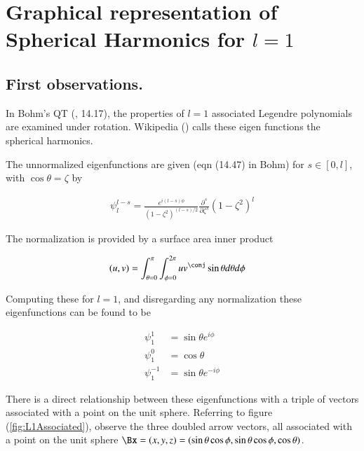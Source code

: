 %

\chapter{Graphical representation of Spherical Harmonics for $l=1$}
\label{chap:L1Associated}
{}
\date{Aug 16, 2009}

\beginArtNoToc

\section{First observations.}

In Bohm's QT (\cite{bohm1989qt}, 14.17), the properties of $l=1$ associated Legendre polynomials are examined under rotation.  Wikipedia (\cite{wiki:sphericalHarm}) calls these eigen functions the spherical harmonics.

The unnormalized eigenfunctions are given (eqn (14.47) in Bohm) for $s \in [0,l]$, with $\cos\theta = \zeta$ by

\begin{align}\label{eqn:L1Associated:foo0}
\psi_l^{l-s} = \frac{e^{i(l-s)\phi}}{(1-\zeta^2)^{(l-s)/2}} \frac{\partial^s}{\partial \zeta^s} (1-\zeta^2)^l
\end{align}

The normalization is provided by a surface area inner product

\begin{align}\label{eqn:L1Associated:foo2}
(u,v) &= \int_{\theta=0}^{\pi} \int_{\phi=0}^{2\pi} u v^\conj \sin\theta d\theta d\phi
\end{align}

Computing these for $l=1$, and disregarding any normalization these eigenfunctions can be found to be

\begin{align}\label{eqn:L1Associated:foo1}
\psi_1^1 &= \sin\theta e^{i\phi} \\
\psi_1^0 &= \cos\theta \\
\psi_1^{-1} &= \sin\theta e^{-i\phi}
\end{align}

There is a direct relationship between these eigenfunctions with a triple of vectors associated with a point on the unit sphere.  Referring to figure (\ref{fig:L1Associated}), observe the three doubled arrow vectors, all associated with a point on the unit sphere $\Bx = (x,y,z) = (\sin\theta \cos\phi, \sin\theta \cos\phi, \cos\theta)$.  

